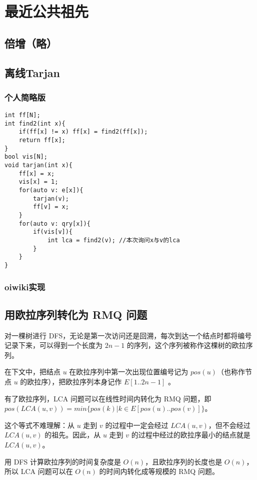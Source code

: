 \section{最近公共祖先}
\subsection{倍增（略）}
\subsection{离线Tarjan}
\subsubsection{个人简略版}
\begin{lstlisting}
int ff[N];
int find2(int x){
    if(ff[x] != x) ff[x] = find2(ff[x]);
    return ff[x];
}
bool vis[N];
void tarjan(int x){
    ff[x] = x;
    vis[x] = 1;
    for(auto v: e[x]){
        tarjan(v);
        ff[v] = x;
    }
    for(auto v: qry[x]){
        if(vis[v]){
            int lca = find2(v); //本次询问x与v的lca
        }
    }
}
\end{lstlisting}
\subsubsection{oiwiki实现}


\subsection{用欧拉序列转化为 RMQ 问题}

对一棵树进行 DFS，无论是第一次访问还是回溯，每次到达一个结点时都将编号记录下来，可以得到一个长度为 $2n - 1$ 的序列，这个序列被称作这棵树的欧拉序列。

在下文中，把结点 $u$ 在欧拉序列中第一次出现位置编号记为 $pos(u)$（也称作节点 $u$ 的欧拉序），把欧拉序列本身记作 $E[1..2n-1]$ 。

有了欧拉序列，LCA 问题可以在线性时间内转化为 RMQ 问题，即 $pos(LCA(u,v)) = min\{pos(k)|k \in E[pos(u)..pos(v)]\}$。

这个等式不难理解：从 $u$ 走到 $v$ 的过程中一定会经过 $LCA(u,v)$，但不会经过 $LCA(u,v)$ 的祖先。因此，从 $u$ 走到 $v$ 的过程中经过的欧拉序最小的结点就是 $LCA(u,v)$。

用 DFS 计算欧拉序列的时间复杂度是 $O(n)$，且欧拉序列的长度也是 $O(n)$，所以 LCA 问题可以在 $O(n)$ 的时间内转化成等规模的 RMQ 问题。

